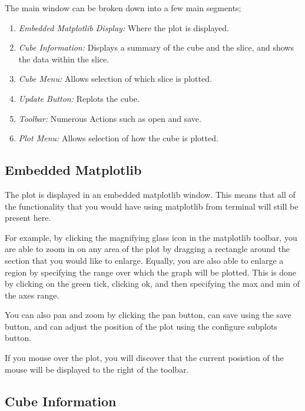 \documentclass[a4paper,12pt]{article}
\begin{document}
The main window can be broken down into a few main segments;

\begin{enumerate}

\item
\emph{Embedded Matplotlib Display:} Where the plot is displayed.

\item
\emph{Cube Information:} Displays a summary of the cube and the slice, and
shows the data within the slice.

\item
\emph{Cube Menu:} Allows selection of which slice is plotted.

\item
\emph{Update Button:} Replots the cube.

\item
\emph{Toolbar:} Numerous Actions such as open and save.

\item
\emph{Plot Menu:} Allows selection of how the cube is plotted.


\end{enumerate}

\subsection{Embedded Matplotlib}

The plot is displayed in an embedded matplotlib window. This means that all of
the functionality that you would have using matplotlib from terminal will still
be present here.

For example, by clicking the magnifying glass icon in the matplotlib toolbar,
you are able to zoom in on any area of the plot by dragging a rectangle around
the section that you would like to enlarge. Equally, you are also able to
enlarge a region by specifying the range over which the  graph will be plotted.
This is done by clicking on the green tick, clicking ok, and then specifying
the max and min of the axes range.

You can also pan and zoom by clicking the pan button, can save using the save
button, and can adjust the position of the plot using the configure subplots
button.

If you mouse over the plot, you will discover that the current posistion of the
mouse will be displayed to the right of the toolbar.

\subsection{Cube Information}
\end{document}
